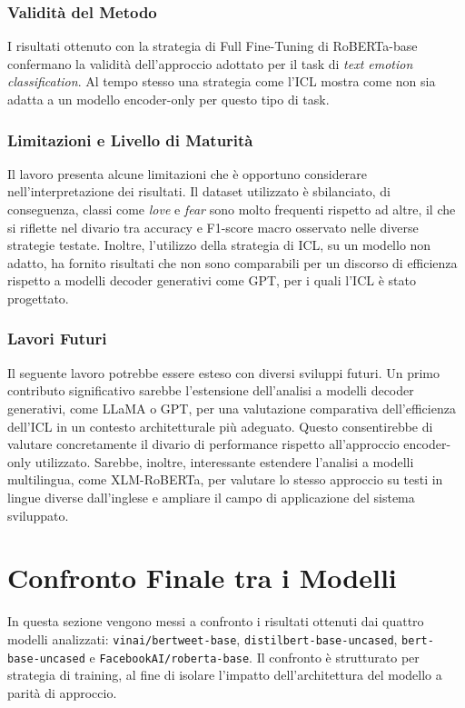 \documentclass[a4paper,12pt]{article}
\begin{document}
\subsubsection{Validità del Metodo}
I risultati ottenuto con la strategia di Full Fine-Tuning di RoBERTa-base confermano la validità dell'approccio adottato per il task di \textit{text emotion classification}. Al tempo stesso una strategia come l'ICL mostra come non sia adatta a un modello encoder-only per questo tipo di task.

\subsubsection{Limitazioni e Livello di Maturità}
Il lavoro presenta alcune limitazioni che è opportuno considerare nell'interpretazione dei risultati. Il dataset utilizzato è sbilanciato, di conseguenza, classi come \textit{love} e \textit{fear} sono molto frequenti rispetto ad altre, il che si riflette nel
divario tra accuracy e F1-score macro osservato nelle diverse strategie testate.
Inoltre, l'utilizzo della strategia di ICL, su un modello non adatto, ha fornito risultati che non sono comparabili per un discorso di efficienza rispetto a modelli decoder generativi come GPT, per i quali l'ICL è stato progettato.

\subsubsection{Lavori Futuri}
Il seguente lavoro potrebbe essere esteso con diversi sviluppi futuri.
Un primo contributo significativo sarebbe l'estensione dell'analisi a modelli decoder generativi, come LLaMA o GPT, per una valutazione comparativa dell'efficienza dell'ICL in un contesto architetturale più adeguato. Questo consentirebbe di valutare concretamente il divario di performance rispetto all'approccio encoder-only utilizzato.
Sarebbe, inoltre, interessante estendere l'analisi a modelli multilingua, come XLM-RoBERTa, per valutare lo stesso approccio su testi in lingue diverse dall'inglese e ampliare il campo di applicazione del sistema sviluppato.

\section{Confronto Finale tra i Modelli}

In questa sezione vengono messi a confronto i risultati ottenuti dai quattro modelli analizzati:
\texttt{vinai/bertweet-base}, \texttt{distilbert-base-uncased}, \texttt{bert-base-uncased} e \texttt{FacebookAI/roberta-base}.
Il confronto è strutturato per strategia di training, al fine di isolare l'impatto dell'architettura del modello
a parità di approccio.
\end{document}
